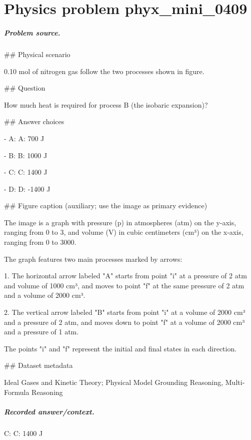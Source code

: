 
\chapter{Physics problem phyx\_mini\_0409}
\label{ch:PhyXMiniProblems_problem_phyx_mini_0409}

\paragraph{Problem source.}
\#\# Physical scenario

0.10 mol of nitrogen gas follow the two processes shown in figure.

\#\# Question

How much heat is required for process B (the isobaric expansion)?

\#\# Answer choices

- A: A: 700 J

- B: B: 1000 J

- C: C: 1400 J

- D: D: -1400 J

\#\# Figure caption (auxiliary; use the image as primary evidence)

The image is a graph with pressure (p) in atmospheres (atm) on the y-axis, ranging from 0 to 3, and volume (V) in cubic centimeters (cm³) on the x-axis, ranging from 0 to 3000. 

The graph features two main processes marked by arrows:

1. The horizontal arrow labeled "A" starts from point "i" at a pressure of 2 atm and volume of 1000 cm³, and moves to point "f" at the same pressure of 2 atm and a volume of 2000 cm³. 

2. The vertical arrow labeled "B" starts from point "i" at a volume of 2000 cm³ and a pressure of 2 atm, and moves down to point "f" at a volume of 2000 cm³ and a pressure of 1 atm.

The points "i" and "f" represent the initial and final states in each direction.

\#\# Dataset metadata

Ideal Gases and Kinetic Theory; Physical Model Grounding Reasoning, Multi-Formula Reasoning

\paragraph{Recorded answer/context.}
C: C: 1400 J

